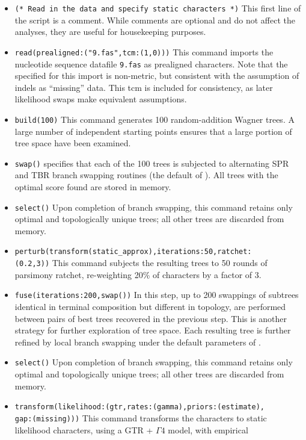 \begin{itemize}
\item \texttt{(* Read in the data and specify static characters *)} This first line of the script is a comment. While 
comments are optional and do not affect the analyses, they are useful for housekeeping purposes.
\item \texttt{read(prealigned:("9.fas",tcm:(1,0)))}
This command imports the nucleotide sequence datafile \texttt{9.fas} as prealigned characters. Note that the 
 specified for this import is non-metric, but consistent with the assumption of indels as 
``missing'' data. This tcm is included for consistency, as later likelihood swaps make equivalent assumptions.
\item \texttt{build(100)} This command generates 100 random-addition Wagner trees. A large number of 
independent starting points ensures that a large portion of tree space have been examined.
\item \texttt{swap()}  specifies that each of the 100 trees is subjected to alternating SPR and 
TBR branch swapping routines (the default of \poy). All trees with the optimal score found are stored in memory.
\item \texttt{select()} Upon completion of branch swapping, this command retains only optimal and topologically 
unique trees; all other trees are discarded from memory. 
\item \texttt{perturb(transform(static\_approx),iterations:50,ratchet:\\(0.2,3))} This command subjects the resulting 
trees to 50 rounds of parsimony ratchet, re-weighting 20\% of characters by a factor of 3.
\item \texttt{fuse(iterations:200,swap())} In this step, up to 200 swappings of subtrees identical in terminal 
composition but different in topology, are performed between pairs of best trees recovered in the previous step. 
This is another strategy for further exploration of tree space. Each resulting tree is further refined by local branch 
swapping under the default parameters of .
\item \texttt{select()} Upon completion of branch swapping, this command retains only optimal and topologically
 unique trees; all other trees are discarded from memory.
\item \texttt{transform(likelihood:(gtr,rates:(gamma),priors:(estimate),\\gap:(missing)))} This command 
transforms the characters to static likelihood characters, using a GTR + $\Gamma 4$ model, with empirical 

\end{itemize}
